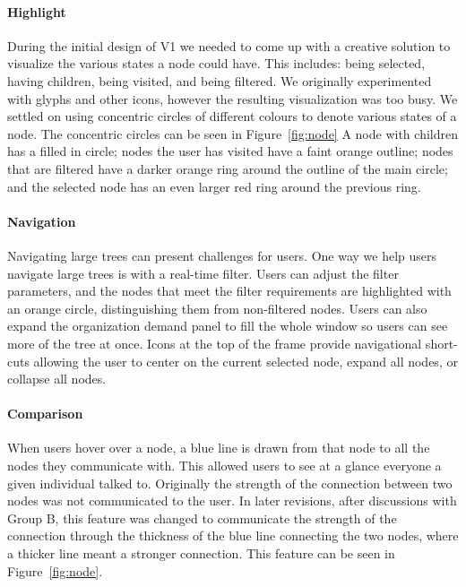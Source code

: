 \documentclass[journal]{vgtc}                %
\begin{document}
\paragraph{Highlight}
During the initial design of V1 we needed to come up with a creative solution to visualize the various states a node could have.  This includes: being selected, having children, being visited, and being filtered.  We originally experimented with glyphs and other icons, however the resulting visualization was too busy.  We settled on using concentric circles of different colours to denote various states of a node. The concentric circles can be seen in Figure~\ref{fig:node}  A node with children has a filled in circle; nodes the user has visited have a faint orange outline; nodes that are filtered have a darker orange ring around the outline of the main circle; and the selected node has an even larger red ring around the previous ring.  

\paragraph{Navigation}
Navigating large trees can present challenges for users.  One way we help users navigate large trees is with a real-time filter. Users can adjust the filter parameters, and the nodes that meet the filter requirements are highlighted with an orange circle, distinguishing them from non-filtered nodes.  Users can also expand the organization demand panel to fill the whole window so users can see more of the tree at once. Icons at the top of the frame provide navigational short-cuts allowing the user to center on the current selected node, expand all nodes, or collapse all nodes.

\paragraph{Comparison}
When users hover over a node, a blue line is drawn from that node to all the nodes they communicate with. This allowed users to see at a glance everyone a given individual talked to. Originally the strength of the connection between two nodes was not communicated to the user. In later revisions, after discussions with Group B, this feature was changed to communicate the strength of the connection through the thickness of the blue line connecting the two nodes, where a thicker line meant a stronger connection. This feature can be seen in Figure~\ref{fig:node}.
\end{document}
